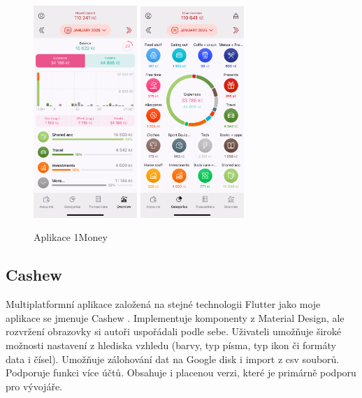 \documentclass[
  biblatex,
  figures=true,
  tables=false,
  glossaries,
  index
]{kidiplom}
\begin{document}
\begin{figure}
    \centering
    \includegraphics[width=0.35\textwidth]{images/onemoney1.PNG}
    \hspace{10px}
    \includegraphics[width=0.35\textwidth]{images/onemoney2.PNG}
    \caption{Aplikace 1Money}
\end{figure}

\subsection{Cashew}
Multiplatformní aplikace založená na stejné technologii Flutter jako moje aplikace se jmenuje Cashew \cite{cashew}. Implementuje komponenty z Material Design, ale rozvržení obrazovky si autoři uspořádali podle sebe. Uživateli umožňuje široké možnosti nastavení z hlediska vzhledu (barvy, typ písma, typ ikon či formáty data i čísel). Umožňuje zálohování dat na Google disk i import z csv souborů. Podporuje funkci více účtů. Obsahuje i placenou verzi, které je primárně podporu pro vývojáře.
\end{document}
